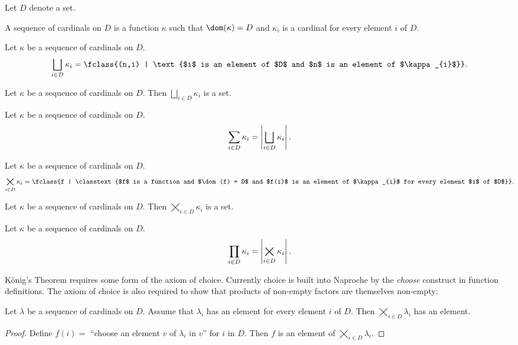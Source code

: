 \documentclass{article}
\newcommand{\SumSet}[2]{\bigsqcup_{i \in #2} #1_{i}}
\newcommand{\Sum}[2]{\sum_{i \in #2} #1_{i}}
\newcommand{\ProdSet}[2]{\bigtimes_{i \in #2} #1_{i}}
\newcommand{\Prod}[2]{\prod_{i \in #2} #1_{i}}
\begin{document}
\begin{forthel}
  Let $D$ denote a set.

  \begin{definition*}
    A sequence of cardinals on $D$ is a function $\kappa$ such that
    $\dom(\kappa) = D$ and $\kappa_{i}$ is a cardinal for every element $i$ of
    $D$.
  \end{definition*}

  \begin{definition*}
    Let $\kappa$ be a sequence of cardinals on $D$.
    \[ \SumSet{\kappa}{D} = \fclass{(n,i) | \text{$i$ is an element of $D$ and
    $n$ is an element of $\kappa_{i}$}}. \]
  \end{definition*}

  \begin{axiom*}
    Let $\kappa$ be a sequence of cardinals on $D$.
    Then $\SumSet{\kappa}{D}$ is a set.
  \end{axiom*}

  \begin{definition*}
    Let $\kappa$ be a sequence of cardinals on $D$.
    \[ \Sum{\kappa}{D} = \card{\SumSet{\kappa}{D}}. \]
  \end{definition*}

  \begin{definition*}
    Let $\kappa$ be a sequence of cardinals on $D$.
    \[ \ProdSet{\kappa}{D} = \fclass{f | \classtext{$f$ is a function and
    $\dom(f) = D$ and $f(i)$ is an element of $\kappa_{i}$ for every element
    $i$ of $D$}}. \]
  \end{definition*}

  \begin{axiom*}
    Let $\kappa$ be a sequence of cardinals on $D$.
    Then $\ProdSet{\kappa}{D}$ is a set.
  \end{axiom*}

  \begin{definition*}
    Let $\kappa$ be a sequence of cardinals on $D$.
    \[ \Prod{\kappa}{D} = \card{\ProdSet{\kappa}{D}}. \]
  \end{definition*}
\end{forthel}

König's Theorem requires some form of the axiom of choice.
Currently choice is built into Naproche by the \emph{choose} construct in
function definitions.
The axiom of choice is also required to show that products of non-empty factors
are themselves non-empty:

\begin{forthel}
  \begin{lemma*}[Choice]
    Let $\lambda$ be a sequence of cardinals on $D$.
    Assume that $\lambda_{i}$ has an element for every element $i$ of $D$.
    Then $\ProdSet{\lambda}{D}$ has an element.
  \end{lemma*}
  \begin{proof}
    Define $f(i) =$ ``choose an element $v$ of $\lambda_{i}$ in $v$'' for $i$
    in $D$.
    Then $f$ is an element of $\ProdSet{\lambda}{D}$.
  \end{proof}
\end{forthel}
\end{document}
